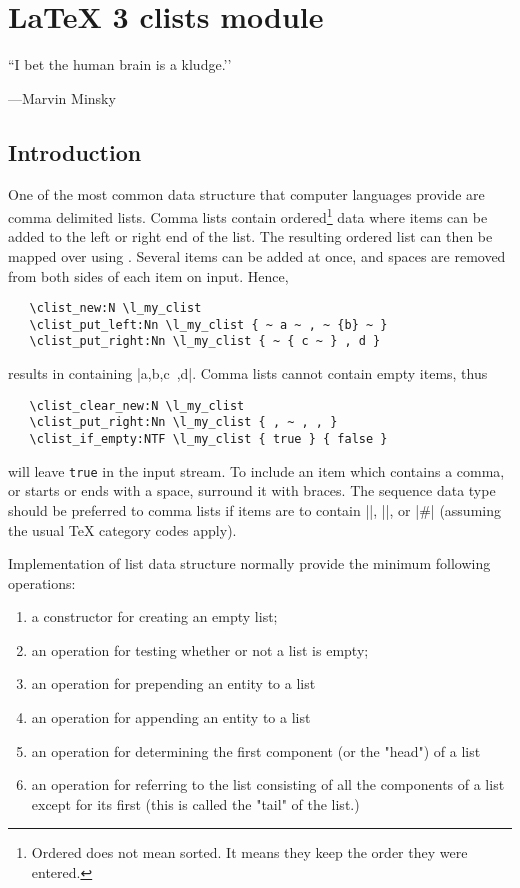 \chapter{LaTeX 3 clists module}

\epigraph{``I bet the human brain is a kludge.’’ }{---Marvin Minsky}


\section{Introduction}

One of the most common data structure that computer languages provide are comma delimited lists.
 Comma lists contain ordered\footnote{Ordered does not mean sorted. It means they keep the order they were entered.} data where items can be added to the left
 or right end of the list. The resulting ordered list can then
 be mapped over using . Several items can
 be added at once, and spaces are removed from both sides of each item
 on input. Hence,
 \begin{verbatim}
   \clist_new:N \l_my_clist
   \clist_put_left:Nn \l_my_clist { ~ a ~ , ~ {b} ~ }
   \clist_put_right:Nn \l_my_clist { ~ { c ~ } , d }
 \end{verbatim}
 results in  containing |a,{b},{c~},d|.
 Comma lists cannot contain empty items, thus
 \begin{verbatim}
   \clist_clear_new:N \l_my_clist
   \clist_put_right:Nn \l_my_clist { , ~ , , }
   \clist_if_empty:NTF \l_my_clist { true } { false }
 \end{verbatim}
 will leave \texttt{true} in the input stream. To include an item
 which contains a comma, or starts or ends with a space,
 surround it with braces.  The sequence data type should be preferred
 to comma lists if items are to contain |{|, |}|, or |#| (assuming the
 usual \TeX{} category codes apply).

Implementation of list data structure normally provide the minimum following operations:

\begin{enumerate}
\item a constructor for creating an empty list;
\item an operation for testing whether or not a list is empty;
\item an operation for prepending an entity to a list
\item an operation for appending an entity to a list
\item an operation for determining the first component (or the "head") of a list
\item an operation for referring to the list consisting of all the components of a list except for its first (this is called the "tail" of the list.)
\end{enumerate}

